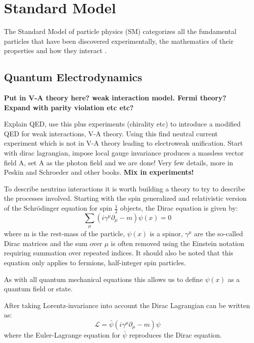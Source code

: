 \section{Standard Model}\label{section:SM}

The Standard Model of particle physics (SM) categorizes all the fundamental particles that have been discovered experimentally, the mathematics of their properties and how they interact \cite{32Burchan:1995, 38griffiths}. 

\subsection{Quantum Electrodynamics}

\textbf{Put in V-A theory here? weak interaction model. Fermi theory?}
\textbf{Expand with parity violation etc etc?}

Explain QED, use this plus experiments (chirality etc) to introduce a modified QED for weak interactions, V-A theory. Using this find neutral current experiment which is not in V-A theory leading to electroweak unification.
Start with dirac lagrangian, impose local gauge invariance produces a massless vector field A, set A as the photon field and we are done! 
Very few details, more in Peskin and Schroeder and other books.
\textbf{Mix in experiments!}
\fi

To describe neutrino interactions it is worth building a theory to try to describe the processes involved. Starting with the spin generalized and relativistic version of the Schr\"{o}dinger equation for spin $\frac{1}{2}$ objects, the Dirac equation is given by:
\begin{equation}
\sum_\mu (i\gamma^\mu \partial_\mu - m)\psi(x) = 0
\end{equation}
where m is the rest-mass of the particle, $\psi(x)$ is a spinor,  $\gamma^\mu$ are the so-called Dirac matrices and the sum over $\mu$ is often removed using the Einstein notation requiring summation over repeated indices. It should also be noted that this equation only applies to fermions, half-integer spin particles.

As with all quantum mechanical equations this allows us to define $\psi(x)$ as a quantum field or state.

After taking Lorentz-invariance into account the Dirac Lagrangian can be written as:
\begin{equation}
\mathcal{L} = \bar{\psi}(i\gamma^\mu\partial_\mu-m)\psi
\end{equation}
where the Euler-Lagrange equation for $\bar{\psi}$ reproduces the Dirac equation.

